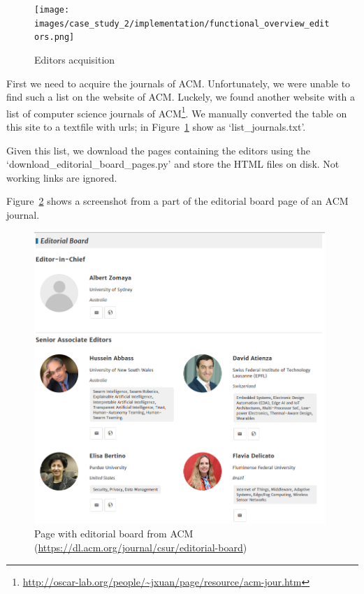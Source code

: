 \documentclass{ou-report}
\begin{document}
\begin{figure}[H]
    \centering
    \texttt{[image: images/case\_study\_2/implementation/functional\_overview\_editors.png]}
    \caption{Editors acquisition}
    \label{fig:functional_overview_editors}
\end{figure}

First we need to acquire the journals of ACM. Unfortunately, we were
unable to find such a list on the website of ACM. Luckely, we found
another website with a list of computer science journals of 
ACM\footnote{\url{http://oscar-lab.org/people/~jxuan/page/resource/acm-jour.htm}}.
We manually converted the table on this site to a textfile with urls; in
Figure~\ref{fig:functional_overview_editors} show as `list\_journals.txt'.

Given this list, we download the pages containing the editors using the \newline
`download\_editorial\_board\_pages.py' and store the HTML files on disk. 
Not working links are ignored.

Figure~\ref{fig:acm_editorial_board} shows a screenshot from a part of the 
editorial board page of an ACM journal.

\begin{figure}[ht]
\centering
\includegraphics[width=11cm]{images/acm_editorial_board.png}
\caption{Page with editorial board from ACM (\url{https://dl.acm.org/journal/csur/editorial-board})}
\label{fig:acm_editorial_board}
\end{figure}
\end{document}
